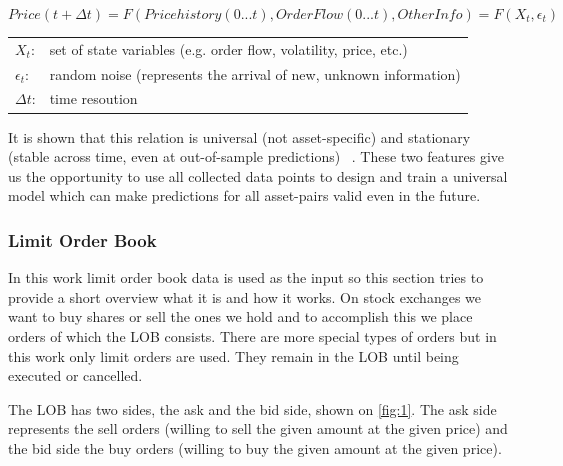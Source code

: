 \documentclass[11pt,a4paper,oneside]{article}
\begin{document}
  \begin{equation}
    Price(t+\Delta t) = F(Price history(0...t), Order Flow(0...t), Other Info) = F(X_{t}, \epsilon_{t})
    \label{eq:1}
  \end{equation}


  \begin{center}
    \begin{tabular}{l l}
      $X_{t}$: & set of state variables (e.g. order flow, volatility, price, etc.) \\
      $\epsilon_{t}$: & random noise (represents the arrival of new, unknown information) \\
      $\Delta t$: & time resoution
    \end{tabular}
  \end{center}

  \bigskip

  It is shown that this relation is universal (not asset-specific) and stationary (stable across time, even at 
  out-of-sample predictions) ~\cite{univ}. These two features give us the opportunity to use all collected data points 
  to design and train a universal model which can make predictions for all asset-pairs valid even in the future.

  \subsubsection{Limit Order Book}
  \label{sec:limit_order_book}
  
  In this work limit order book data is used as the input so this section tries to provide a short overview what it is 
  and how it works. On stock exchanges we want to buy shares or sell the ones we hold and to accomplish this we place 
  orders of which the LOB consists. There are more special types of orders but in this work only limit orders are used. 
  They remain in the LOB until being executed or cancelled.
  
  The LOB has two sides, the ask and the bid side, shown on \autoref{fig:1}. The ask side represents the sell orders 
  (willing to sell the given amount at the given price) and the bid side the buy orders (willing to buy the given amount 
  at the given price).
\end{document}
